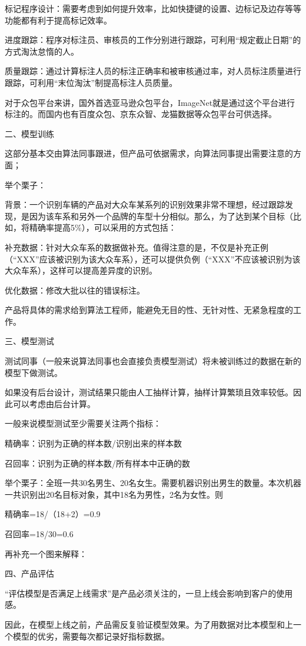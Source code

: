 \documentclass[letterpaper,11pt,english]{sphinxmanual}
\begin{document}
标记程序设计：需要考虑到如何提升效率，比如快捷键的设置、边标记及边存等等功能都有利于提高标记效率。

进度跟踪：程序对标注员、审核员的工作分别进行跟踪，可利用“规定截止日期”的方式淘汰怠惰的人。

质量跟踪：通过计算标注人员的标注正确率和被审核通过率，对人员标注质量进行跟踪，可利用“末位淘汰”制提高标注人员质量。

对于众包平台来讲，国外首选亚马逊众包平台，ImageNet就是通过这个平台进行标注的。而国内也有百度众包、京东众智、龙猫数据等众包平台可供选择。

二、模型训练

这部分基本交由算法同事跟进，但产品可依据需求，向算法同事提出需要注意的方面；

举个栗子：

背景：一个识别车辆的产品对大众车某系列的识别效果非常不理想，经过跟踪发现，是因为该车系和另外一个品牌的车型十分相似。那么，为了达到某个目标（比如，将精确率提高5\%），可以采用的方式包括：

补充数据：针对大众车系的数据做补充。值得注意的是，不仅是补充正例（“XXX”应该被识别为该大众车系），还可以提供负例（“XXX”不应该被识别为该大众车系），这样可以提高差异度的识别。

优化数据：修改大批以往的错误标注。

产品将具体的需求给到算法工程师，能避免无目的性、无针对性、无紧急程度的工作。

三、模型测试

测试同事（一般来说算法同事也会直接负责模型测试）将未被训练过的数据在新的模型下做测试。

如果没有后台设计，测试结果只能由人工抽样计算，抽样计算繁琐且效率较低。因此可以考虑由后台计算。

一般来说模型测试至少需要关注两个指标：

精确率：识别为正确的样本数/识别出来的样本数

召回率：识别为正确的样本数/所有样本中正确的数

举个栗子：全班一共30名男生、20名女生。需要机器识别出男生的数量。本次机器一共识别出20名目标对象，其中18名为男性，2名为女性。则

精确率=18/（18+2）=0.9

召回率=18/30=0.6

再补充一个图来解释：

四、产品评估

“评估模型是否满足上线需求”是产品必须关注的，一旦上线会影响到客户的使用感。

因此，在模型上线之前，产品需反复验证模型效果。为了用数据对比本模型和上一个模型的优劣，需要每次都记录好指标数据。
\end{document}
